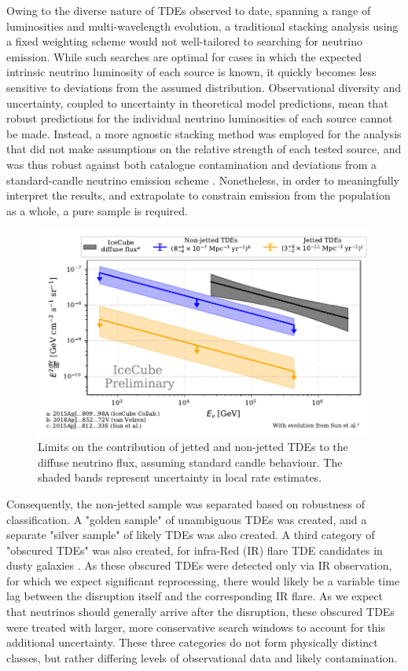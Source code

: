 \documentclass{PoS}
\begin{document}
Owing to the diverse nature of TDEs observed to date, spanning a range of luminosities and multi-wavelength evolution, a traditional stacking analysis using a fixed weighting scheme would not well-tailored to searching for neutrino emission. While such searches are optimal for cases in which the expected intrinsic neutrino luminosity of each source is known, it quickly becomes less sensitive to deviations from the assumed distribution. Observational diversity and uncertainty, coupled to uncertainty in theoretical model predictions, mean that robust predictions for the individual neutrino luminosities of each source cannot be made. Instead, a more agnostic stacking method was employed for the analysis that did not make assumptions on the relative strength of each tested source, and was thus robust against both catalogue contamination and deviations from a standard-candle neutrino emission scheme \cite{Stasik2018Search}. Nonetheless, in order to meaningfully interpret the results, and extrapolate to constrain emission from the population as a whole, a pure sample is required. 

\begin{figure}[!ht]
	\centering \includegraphics[width=\textwidth]{figures/diffuse_flux_global_fit}
	\caption{Limits on the contribution of jetted and non-jetted TDEs to the diffuse neutrino flux, assuming standard candle behaviour. The shaded bands represent uncertainty in local rate estimates.}
	\label{fig:DiffuseFlux}
\end{figure}

Consequently, the non-jetted sample was separated based on robustness of classification. A "golden sample" of unambiguous TDEs was created, and a separate "silver sample" of likely TDEs was also created. A third category of "obscured TDEs" was also created, for infra-Red (IR) flare TDE candidates in dusty galaxies \cite{Wang:2018mxl}. As these obscured TDEs were detected only via IR observation, for which we expect significant reprocessing, there would likely be a variable time lag between the disruption itself and the corresponding IR flare. As we expect that neutrinos should generally arrive after the disruption, these obscured TDEs were treated with larger, more conservative search windows to account for this additional uncertainty. These three categories do not form physically distinct classes, but rather differing levels of observational data and likely contamination.
\end{document}
